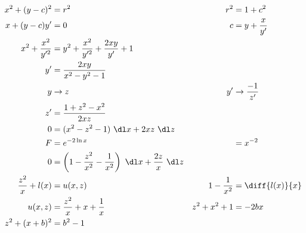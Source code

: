 \begin{enumerate}
          \begin{align}
              x^{2} + (y-c)^{2}             & = r^{2}                                                                                & r^{2}               & = 1  + c^{2}              \\
              x + (y-c)y'                   & = 0                                                                                    & c                   & =  y + \frac{x}{y'}       \\
              x^{2}  + \frac{x^{2}}{y'^{2}} & = y^{2} + \frac{x^{2}}{y'^{2}} + \frac{2xy}{y'} + 1                                                                                      \\
              y'                            & = \frac{2xy}{x^{2} - y^{2} - 1}                                                                                                          \\
              y                             & \rightarrow z                                                                          & y'                  & \rightarrow \frac{-1}{z'} \\
              z'                            & = \frac{1 + z^{2} - x^{2}}{2xz}                                                                                                          \\
              0                             & = (x^{2} - z^{2} - 1)\ \dl x + 2xz\ \dl z                                                                                                \\
              F                             & = e^{-2\ln x}                                                                          &                     & = x^{-2}                  \\
              0                             & = \left( 1 - \frac{z^{2}}{x^{2}} - \frac{1}{x^{2}}\right)\ \dl x + \frac{2z}{x}\ \dl z                                                   \\
              \frac{z^{2}}{x} + l(x)        & = u(x, z)                                                                              & 1 - \frac{1}{x^{2}} & = \diff{l(x)}{x}          \\
              u(x, z)                       & = \frac{z^{2}}{x} + x + \frac{1}{x}                                                    & z^{2} + x^{2}  +1   & = -2bx                    \\
              z^{2} + (x + b)^{2}           & = b^{2} - 1
          \end{align}


\end{enumerate}

